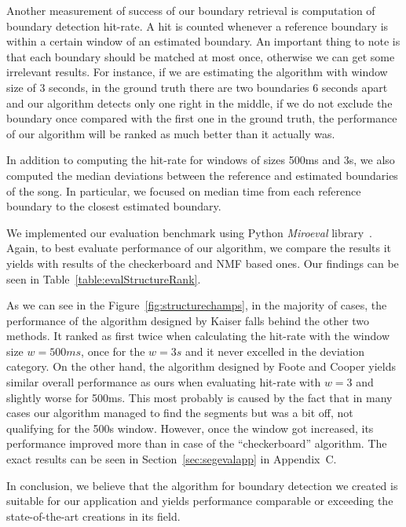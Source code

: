 Another measurement of success of our boundary retrieval is computation of boundary detection hit-rate. A hit is counted whenever a reference boundary is within a certain window of an estimated boundary. An important thing to note is that each boundary should be matched at most once, otherwise we can get some irrelevant results. For instance, if we are estimating the algorithm with window size of 3 seconds, in the ground truth there are two boundaries 6 seconds apart and our algorithm detects only one right in the middle, if we do not exclude the boundary once compared with the first one in the ground truth, the performance of our algorithm will be ranked as much better than it actually was. 

In addition to computing the hit-rate for windows of sizes 500ms and 3s, we also computed the median deviations between the reference and estimated boundaries of the song. In particular, we focused on median time from each reference boundary to the closest estimated boundary.

We implemented our evaluation benchmark using Python \textit{Miro\textunderscore eval} library~\cite{mireval}.
Again, to best evaluate performance of our algorithm, we compare the results it yields with results of the checkerboard and NMF based ones. Our findings can be seen in Table~\ref{table:evalStructureRank}.


As we can see in the Figure~\ref{fig:structurechamps}, in the majority of cases, the performance of the algorithm designed by Kaiser falls behind the other two methods. It ranked as first twice when calculating the hit-rate with the window size $w=500ms$, once for the $w=3s$ and it never excelled in the deviation category. On the other hand, the algorithm designed by Foote and Cooper yields similar overall performance as ours when evaluating hit-rate with $w=3$ and slightly worse for 500ms. This most probably is caused by the fact that in many cases our algorithm managed to find the segments but was a bit off, not qualifying for the 500s window. However, once the window got increased, its performance improved more than in case of the ``checkerboard'' algorithm. The exact results can be seen in Section~\ref{sec:segevalapp} in Appendix~C. 

In conclusion, we believe that the algorithm for boundary detection we created is suitable for our application and yields performance comparable or exceeding the state-of-the-art creations in its field. 

\vspace{20pt}
\newpage
